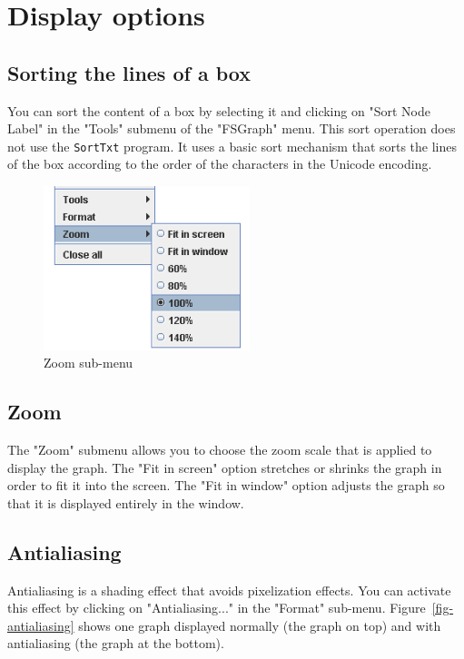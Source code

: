 \bigskip
\section{Display options}

\subsection{Sorting the lines of a box}
You can sort the content of a box by selecting it and clicking on "Sort Node
Label" in the "Tools" submenu of the "FSGraph" menu. This sort operation does
not use the \verb+SortTxt+ program. It uses a basic sort mechanism that sorts
the lines of the box according to the order of the characters in the Unicode
encoding.

\begin{figure}[!h]
\begin{center}
\includegraphics[width=6cm]{resources/img/fig5-21.png}
\caption{Zoom sub-menu}
\end{center}
\end{figure}
\subsection{Zoom}
The "Zoom" submenu allows you to choose the zoom scale that is applied to display the graph.
\noindent The "Fit in screen" option stretches or shrinks the graph in order to fit it into the screen. The "Fit in window" option adjusts the graph so that it is displayed entirely in the window.

\clearpage
\subsection{Antialiasing}
Antialiasing is a shading effect that avoids pixelization
effects. You can activate this effect by clicking on
"Antialiasing..." in the "Format" sub-menu. Figure~\ref{fig-antialiasing}
shows one graph displayed normally (the graph on top) and with antialiasing (the
graph at the bottom).

